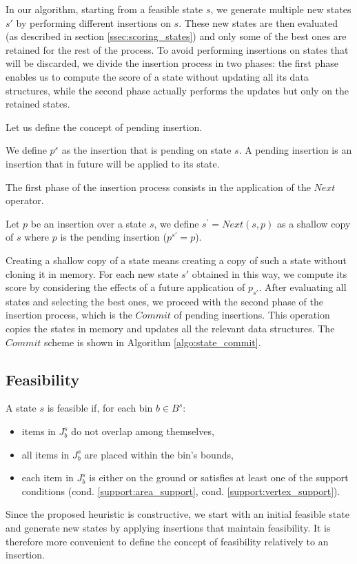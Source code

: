 In our algorithm, starting from a feasible state $s$, we generate multiple new states $s'$ by performing different insertions on $s$. These new states are then evaluated (as described in section \ref{ssec:scoring_states}) and only some of the best ones are retained for the rest of the process. To avoid performing insertions on states that will be discarded, we divide the insertion process in two phases: the first phase enables us to compute the score of a state without updating all its data structures, while the second phase actually performs the updates but only on the retained states. 

Let us define the concept of pending insertion.
\begin{definition}
    We define $p^s$ as the insertion that is pending on state $s$. A pending insertion is an insertion that in future will be applied to its state.
\end{definition}
The first phase of the insertion process consists in the application of the $Next$ operator.
\begin{definition}[Next]
    \label{def:state_next}%
    Let $p$ be an insertion over a state $s$, we define $s^\prime = Next(s, p)$ as a shallow copy of $s$ where $p$ is the pending insertion ($p^{s'} = p$).
\end{definition}
Creating a shallow copy of a state means creating a copy of such a state without cloning it in memory. For each new state $s'$ obtained in this way, we compute its score by considering the effects of a future application of $p_{s'}$. After evaluating all states and selecting the best ones, we proceed with the second phase of the insertion process, which is the $Commit$ of pending insertions. This operation copies the states in memory and updates all the relevant data structures. The $Commit$ scheme is shown in Algorithm \ref{algo:state_commit}.



\subsection{Feasibility}
\label{sec:problem_state:feasibility}%
A state $s$ is feasible if, for each bin $b \in B^s$:
\begin{itemize}
    \item items in $J^s_b$ do not overlap among themselves,
    \item all items in $J^s_b$ are placed within the bin's bounds,
    \item each item in $J^s_b$ is either on the ground or satisfies at least one of the support conditions (cond. \ref{support:area_support}, cond. \ref{support:vertex_support}).
\end{itemize}
Since the proposed heuristic is constructive, we start with an initial feasible state and generate new states by applying insertions that maintain feasibility. It is therefore more convenient to define the concept of feasibility relatively to an insertion.

